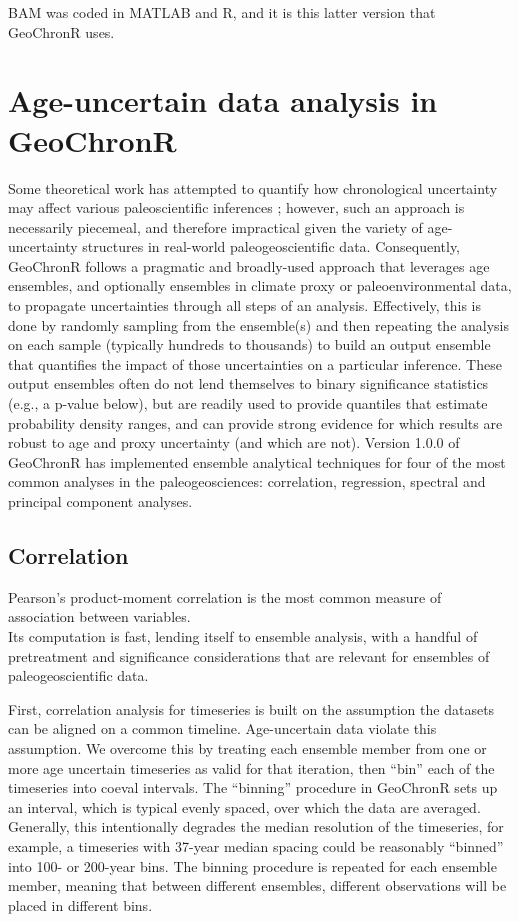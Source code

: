 \documentclass[gc, manuscript]{copernicus}
\begin{document}
BAM was coded in MATLAB and R, and it is this latter version that
GeoChronR uses.

\section{Age-uncertain data analysis in
GeoChronR}\label{sec:age-uncertain-analysis}

Some theoretical work has attempted to quantify how chronological
uncertainty may affect various paleoscientific inferences
\citep[e.g.][]{HuybersWunsch2004}; however, such an approach is
necessarily piecemeal, and therefore impractical given the variety of
age-uncertainty structures in real-world paleogeoscientific data.
Consequently, GeoChronR follows a pragmatic and broadly-used approach
that leverages age ensembles, and optionally ensembles in climate proxy
or paleoenvironmental data, to propagate uncertainties through all steps
of an analysis. Effectively, this is done by randomly sampling from the
ensemble(s) and then repeating the analysis on each sample (typically
hundreds to thousands) to build an output ensemble that quantifies the
impact of those uncertainties on a particular inference. These output
ensembles often do not lend themselves to binary significance statistics
(e.g., a p-value below), but are readily used to provide quantiles that
estimate probability density ranges, and can provide strong evidence for
which results are robust to age and proxy uncertainty (and which are
not). Version 1.0.0 of GeoChronR has implemented ensemble analytical
techniques for four of the most common analyses in the paleogeosciences:
correlation, regression, spectral and principal component analyses.

\subsection{Correlation}

Pearson's product-moment correlation is the most common measure of
association between variables.\\
Its computation is fast, lending itself to ensemble analysis, with a
handful of pretreatment and significance considerations that are
relevant for ensembles of paleogeoscientific data.

First, correlation analysis for timeseries is built on the assumption
the datasets can be aligned on a common timeline. Age-uncertain data
violate this assumption. We overcome this by treating each ensemble
member from one or more age uncertain timeseries as valid for that
iteration, then ``bin'' each of the timeseries into coeval intervals.
The ``binning'' procedure in GeoChronR sets up an interval, which is
typical evenly spaced, over which the data are averaged. Generally, this
intentionally degrades the median resolution of the timeseries, for
example, a timeseries with 37-year median spacing could be reasonably
``binned'' into 100- or 200-year bins. The binning procedure is repeated
for each ensemble member, meaning that between different ensembles,
different observations will be placed in different bins.
\end{document}
